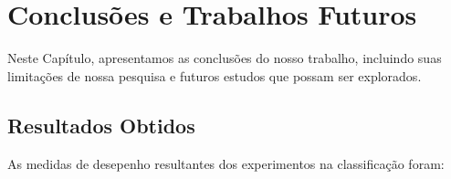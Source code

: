 \documentclass[
	12pt,				%
	openright,			%
	oneside,	
	a4paper,				%
	english,				%
	brazil				%
]{abntex2/abntex2} %
\begin{document}

	
\chapter{Conclusões e Trabalhos Futuros}

	Neste Capítulo, apresentamos as conclusões do nosso trabalho, incluindo suas limitações de nossa pesquisa e futuros estudos que possam ser explorados.

	\section{Resultados Obtidos}

	As medidas de desepenho resultantes dos experimentos na classificação foram: 
	\\
	
\end{document}
